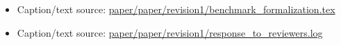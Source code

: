 \begin{itemize}[leftmargin=1.4em,noitemsep]
\item Caption/text source: \begingroup\scriptsize\url{paper/paper/revision1/benchmark_formalization.tex}\endgroup
\item Caption/text source: \begingroup\scriptsize\url{paper/paper/revision1/response_to_reviewers.log}\endgroup
\end{itemize}
